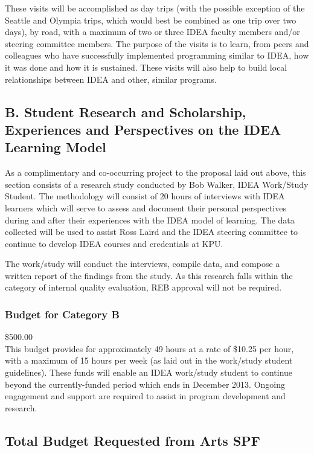 \documentclass[11pt, letterpaper]{article}
\begin{document}
These visits will be accomplished as day trips (with the possible
exception of the Seattle and Olympia trips, which would best be combined
as one trip over two days), by road, with a maximum of two or three IDEA
faculty members and/or steering committee members. The purpose of the
visits is to learn, from peers and colleagues who have successfully
implemented programming similar to IDEA, how it was done and how it is
sustained. These visits will also help to build local relationships
between IDEA and other, similar programs.

\subsection{B. Student Research and Scholarship,\\
Experiences and Perspectives on the IDEA Learning Model}

As a complimentary and co-occurring project to the proposal laid out
above, this section consists of a research study conducted by Bob
Walker, IDEA Work/Study Student. The methodology will consist of 20
hours of interviews with IDEA learners which will serve to assess and
document their personal perspectives during and after their experiences
with the IDEA model of learning. The data collected will be used to
assist Ross Laird and the IDEA steering committee to continue to develop
IDEA courses and credentials at KPU.

The work/study will conduct the interviews, compile data, and compose a
written report of the findings from the study. As this research falls
within the category of internal quality evaluation, REB approval will
not be required.

\subsubsection{Budget for Category B}
\$500.00\\[1em]
\noindent
This budget provides for approximately 49 hours at a rate of \$10.25 per
hour, with a maximum of 15 hours per week (as laid out in the work/study
student guidelines). These funds will enable an IDEA work/study student
to continue beyond the currently-funded period which ends in December
2013. Ongoing engagement and support are required to assist in program
development and research.

\subsection{Total Budget Requested from Arts SPF}
\end{document}

